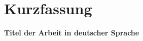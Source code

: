 \chapter{Kurzfassung} \label{vor:kurzfassung}

\textsf{\Large \bfseries Titel der Arbeit in deutscher Sprache}

\lipsum[1-2]
